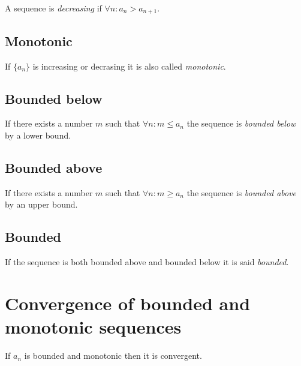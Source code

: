 \documentclass[a4paper]{article}
\begin{document}
A sequence is \textit{decreasing} if \(\forall n:  a_n>a_{n+1}\).

\subsection{Monotonic}

If \(\{a_n\}\) is increasing or decrasing it is also called \textit{monotonic}.

\subsection{Bounded below}

If there exists a number \(m\) such that \(\forall n : m \leq a_n\)
the sequence is \textit{bounded below} by a lower bound.

\subsection{Bounded above}

If there exists a number \(m\) such that \(\forall n : m \geq a_n\)
the sequence is \textit{bounded above} by an upper bound.

\subsection{Bounded}

If the sequence is both bounded above and bounded below it is
said \textit{bounded}.

\section{Convergence of bounded and monotonic sequences}

If \(a_n\) is bounded and monotonic then it is convergent.

\pagebreak
\end{document}
